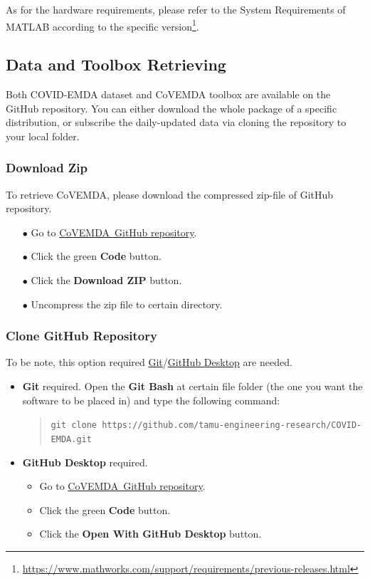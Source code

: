 \documentclass[10pt]{article}
\newcommand{\covemda}{CoVEMDA}
\newcommand{\covemdagithuburl}{https://github.com/tamu-engineering-research/COVID-EMDA}
\numberwithin{equation}{section}
\numberwithin{table}{section}
\numberwithin{figure}{section}
\begin{document}
As for the hardware requirements, please refer to the System Requirements of MATLAB according to the specific version\footnote{\url{https://www.mathworks.com/support/requirements/previous-releases.html}}.

\subsection{Data and Toolbox Retrieving}
Both COVID-EMDA dataset and \covemda{} toolbox are available on the GitHub repository. You can either download the whole package of a specific distribution, or subscribe the daily-updated data via cloning the repository to your local folder.

\subsubsection{Download Zip}
    To retrieve \covemda{}, please download the compressed zip-file of GitHub repository.
\begin{itemize}
    \item[$\bullet$] Go to \href{\covemdagithuburl}{\covemda~GitHub repository}.
    \item[$\bullet$] Click the green \textbf{Code} button.
    \item[$\bullet$] Click the \textbf{Download ZIP} button.
    \item[$\bullet$] Uncompress the zip file to certain directory.
\end{itemize}



\subsubsection{Clone GitHub Repository}
To be note, this option required \href{https://git-scm.com/}{Git}/\href{https://desktop.github.com/}{GitHub Desktop} are needed.
    \begin{itemize}
        \item \textbf{Git} required. Open the \textbf{Git Bash} at certain file folder (the one you want the software to be placed in) and type the following command:
\begin{quotation}
\verb!git clone https://github.com/tamu-engineering-research/COVID-EMDA.git!
\end{quotation}
        \item \textbf{GitHub Desktop} required. 
\begin{itemize}
    \item  Go to \href{\covemdagithuburl}{\covemda~GitHub repository}.
    \item Click the green \textbf{Code} button.
    \item Click the \textbf{Open With GitHub Desktop} button.
\end{itemize}
    \end{itemize} 
\end{document}
